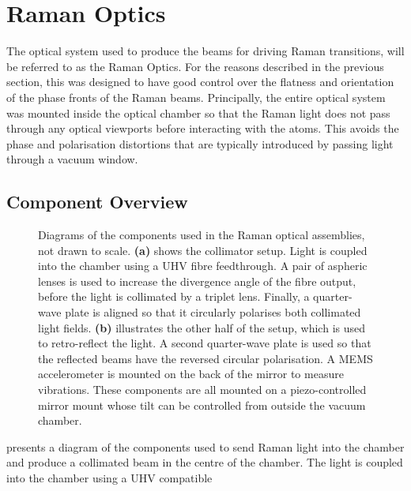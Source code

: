 \section{Raman Optics}\label{sec:setup_ramanoptics}
The optical system used to produce the beams for driving Raman transitions,
will be referred to as the Raman Optics. For the reasons described in
the previous section, this was designed to
have good control over the flatness and orientation of the phase
fronts of the Raman beams. Principally, the entire
optical system was mounted inside the optical chamber so that the Raman light
does not pass through any optical viewports before interacting with the atoms.
This avoids the phase and polarisation distortions that are typically
introduced by passing light through a vacuum window.
\subsection{Component Overview}\label{subsec:setup_ramancollimator}
\begin{figure}[!htbp]
	\centering
	\def\svgwidth{\columnwidth}
  \fontsize{18pt}{18pt}
  \subfloat[][]{\raisebox{.4\height}{\scalebox{0.4}{\label{fig:raman_collimator}}}}\quad
	\subfloat[][]{\scalebox{0.4}{\label{fig:mirror_mount}}}
	\caption[Drawings of the componets used in the Raman optics
		assemblies]{Diagrams of the components used in the Raman optical
      assemblies, not drawn to scale.
      \textbf{(a)} shows the collimator setup. Light is coupled into the chamber using a
		UHV fibre feedthrough. A pair of aspheric lenses is used to increase the
		divergence angle of the fibre output, before the light is collimated by a
		triplet lens. Finally, a quarter-wave plate is aligned so that it circularly
    polarises both collimated light fields. \textbf{(b)} illustrates the other half of the
		setup, which is used to retro-reflect the light. A second quarter-wave plate
		is used so that the reflected beams have the reversed circular
    polarisation. A MEMS accelerometer is mounted on the back of the
		mirror to measure vibrations. These components are all mounted on a
		piezo-controlled mirror mount whose tilt can be controlled from outside the
		vacuum chamber.}
	\label{fig:raman_optics}
\end{figure}
\noindent
{} presents a diagram of the components used to
send Raman light into the chamber and produce a collimated beam in the centre of
the chamber. The light is coupled into the chamber using a UHV compatible
